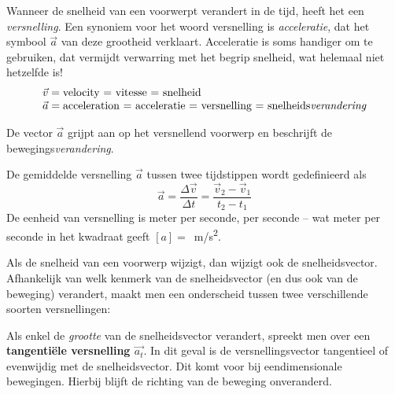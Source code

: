 \documentclass{ximera}
\begin{document}
	\author{Bart Lambregs, Vincent Gellens}
    \xmsource\xmuitleg

	
Wanneer de snelheid van een voorwerpt verandert in de tijd, heeft het een \textit{versnelling}. 
Een synoniem voor het woord versnelling is \textit{acceleratie}, dat het symbool \(\vec{a}\) van deze grootheid verklaart. 
Acceleratie is soms handiger om te gebruiken, dat vermijdt verwarring met het begrip snelheid, wat helemaal niet hetzelfde is!
\[
\begin{array}{l}
	\vec{v} = \text{velocity = vitesse = snelheid} \\
	\vec{a} = \text{acceleration = acceleratie = versnelling = snelheids}\emph{verandering}
\end{array}
\]

De vector \(\vec{a}\) grijpt aan op het versnellend voorwerp en beschrijft de bewegings\textit{verandering}.

\begin{definition}

De gemiddelde versnelling \(\vec{a}\) tussen twee tijdstippen wordt gedefinieerd als
\[
\vec{a}=\frac{\Delta \vec{v}}{\Delta t}=\frac{\vec{v}_2-\vec{v}_1}{t_2-t_1}
\]
De eenheid van versnelling is meter per seconde, per seconde -- wat meter per seconde in het kwadraat geeft $[a]=$\SI{}{m/s^2}.
\end{definition}

Als de snelheid van een voorwerp wijzigt, dan wijzigt ook de snelheidsvector. 
Afhankelijk van welk kenmerk van de snelheidsvector (en dus ook van de beweging) verandert, maakt men een onderscheid tussen twee verschillende soorten versnellingen:


\begin{definition}
Als enkel de \textit{grootte} van de snelheidsvector verandert, spreekt men over een \textbf{tangentiële versnelling \(\vec{a_t}\)}. In dit geval is de versnellingsvector tangentieel of evenwijdig met de snelheidsvector. Dit komt voor bij eendimensionale bewegingen. Hierbij blijft de richting van de beweging onveranderd.
\end{definition}
\end{document}
